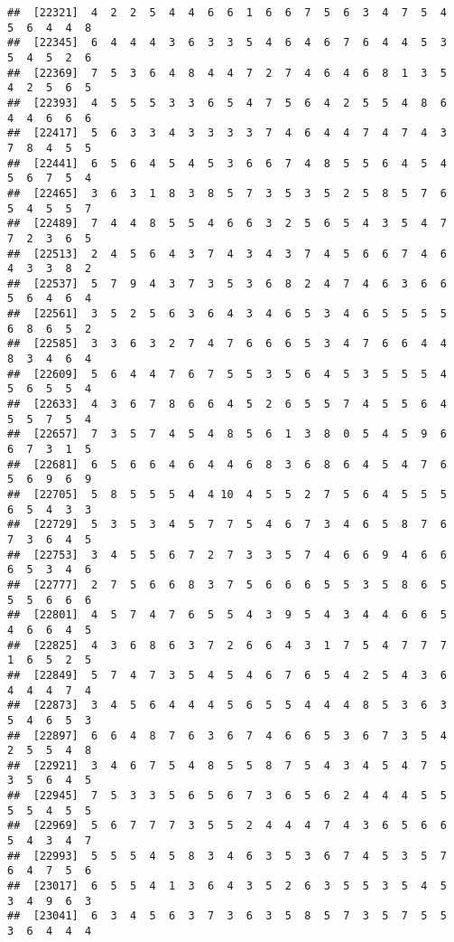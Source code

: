 \documentclass[
]{book}
\begin{document}
\begin{verbatim}
##  [22321]  4  2  2  5  4  4  6  6  1  6  6  7  5  6  3  4  7  5  4  5  6  4  4  8
##  [22345]  6  4  4  4  3  6  3  3  5  4  6  4  6  7  6  4  4  5  3  5  4  5  2  6
##  [22369]  7  5  3  6  4  8  4  4  7  2  7  4  6  4  6  8  1  3  5  4  2  5  6  5
##  [22393]  4  5  5  5  3  3  6  5  4  7  5  6  4  2  5  5  4  8  6  4  4  6  6  6
##  [22417]  5  6  3  3  4  3  3  3  3  7  4  6  4  4  7  4  7  4  3  7  8  4  5  5
##  [22441]  6  5  6  4  5  4  5  3  6  6  7  4  8  5  5  6  4  5  4  5  6  7  5  4
##  [22465]  3  6  3  1  8  3  8  5  7  3  5  3  5  2  5  8  5  7  6  5  4  5  5  7
##  [22489]  7  4  4  8  5  5  4  6  6  3  2  5  6  5  4  3  5  4  7  7  2  3  6  5
##  [22513]  2  4  5  6  4  3  7  4  3  4  3  7  4  5  6  6  7  4  6  4  3  3  8  2
##  [22537]  5  7  9  4  3  7  3  5  3  6  8  2  4  7  4  6  3  6  6  5  6  4  6  4
##  [22561]  3  5  2  5  6  3  6  4  3  4  6  5  3  4  6  5  5  5  5  6  8  6  5  2
##  [22585]  3  3  6  3  2  7  4  7  6  6  6  5  3  4  7  6  6  4  4  8  3  4  6  4
##  [22609]  5  6  4  4  7  6  7  5  5  3  5  6  4  5  3  5  5  5  4  5  6  5  5  4
##  [22633]  4  3  6  7  8  6  6  4  5  2  6  5  5  7  4  5  5  6  4  5  5  7  5  4
##  [22657]  7  3  5  7  4  5  4  8  5  6  1  3  8  0  5  4  5  9  6  6  7  3  1  5
##  [22681]  6  5  6  6  4  6  4  4  6  8  3  6  8  6  4  5  4  7  6  5  6  9  6  9
##  [22705]  5  8  5  5  5  4  4 10  4  5  5  2  7  5  6  4  5  5  5  6  5  4  3  3
##  [22729]  5  3  5  3  4  5  7  7  5  4  6  7  3  4  6  5  8  7  6  7  3  6  4  5
##  [22753]  3  4  5  5  6  7  2  7  3  3  5  7  4  6  6  9  4  6  6  6  5  3  4  6
##  [22777]  2  7  5  6  6  8  3  7  5  6  6  6  5  5  3  5  8  6  5  5  5  6  6  6
##  [22801]  4  5  7  4  7  6  5  5  4  3  9  5  4  3  4  4  6  6  5  4  6  6  4  5
##  [22825]  4  3  6  8  6  3  7  2  6  6  4  3  1  7  5  4  7  7  7  1  6  5  2  5
##  [22849]  5  7  4  7  3  5  4  5  4  6  7  6  5  4  2  5  4  3  6  4  4  4  7  4
##  [22873]  3  4  5  6  4  4  4  5  6  5  5  4  4  4  8  5  3  6  3  5  4  6  5  3
##  [22897]  6  6  4  8  7  6  3  6  7  4  6  6  5  3  6  7  3  5  4  2  5  5  4  8
##  [22921]  3  4  6  7  5  4  8  5  5  8  7  5  4  3  4  5  4  7  5  3  5  6  4  5
##  [22945]  7  5  3  3  5  6  5  6  7  3  6  5  6  2  4  4  4  5  5  5  5  4  5  5
##  [22969]  5  6  7  7  7  3  5  5  2  4  4  4  7  4  3  6  5  6  6  5  4  3  4  7
##  [22993]  5  5  5  4  5  8  3  4  6  3  5  3  6  7  4  5  3  5  7  6  4  7  5  6
##  [23017]  6  5  5  4  1  3  6  4  3  5  2  6  3  5  5  3  5  4  5  3  4  9  6  3
##  [23041]  6  3  4  5  6  3  7  3  6  3  5  8  5  7  3  5  7  5  5  3  6  4  4  4

\end{verbatim}
\end{document}
